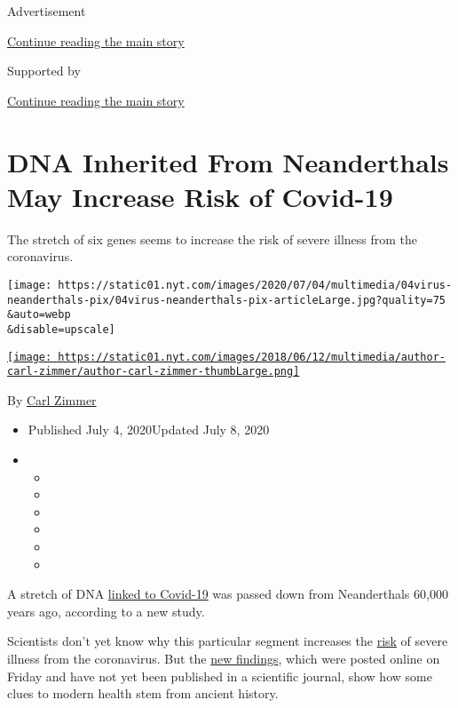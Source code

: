 Advertisement

\protect\hyperlink{after-top}{Continue reading the main story}

Supported by

\protect\hyperlink{after-sponsor}{Continue reading the main story}

\hypertarget{dna-inherited-from-neanderthals-may-increase-risk-of-covid-19}{%
\section{DNA Inherited From Neanderthals May Increase Risk of
Covid-19}\label{dna-inherited-from-neanderthals-may-increase-risk-of-covid-19}}

The stretch of six genes seems to increase the risk of severe illness
from the coronavirus.

\texttt{[image: https://static01.nyt.com/images/2020/07/04/multimedia/04virus-neanderthals-pix/04virus-neanderthals-pix-articleLarge.jpg?quality=75\\\&auto=webp\\\&disable=upscale]}

\href{https://www.nytimes.com/by/carl-zimmer}{\texttt{[image: https://static01.nyt.com/images/2018/06/12/multimedia/author-carl-zimmer/author-carl-zimmer-thumbLarge.png]}}

By \href{https://www.nytimes.com/by/carl-zimmer}{Carl Zimmer}

\begin{itemize}
\item
  Published July 4, 2020Updated July 8, 2020
\item
  \begin{itemize}
  \item
  \item
  \item
  \item
  \item
  \item
  \end{itemize}
\end{itemize}

A stretch of DNA
\href{https://www.nytimes.com/2020/06/03/health/coronavirus-blood-type-genetics.html}{linked
to Covid-19} was passed down from Neanderthals 60,000 years ago,
according to a new study.

Scientists don't yet know why this particular segment increases the
\href{https://www.nytimes.com/2020/07/08/health/coronavirus-risk-factors.html}{risk}
of severe illness from the coronavirus. But the
\href{https://www.biorxiv.org/content/10.1101/2020.07.03.186296v1.full.pdf+html}{new
findings}, which were posted online on Friday and have not yet been
published in a scientific journal, show how some clues to modern health
stem from ancient history.

